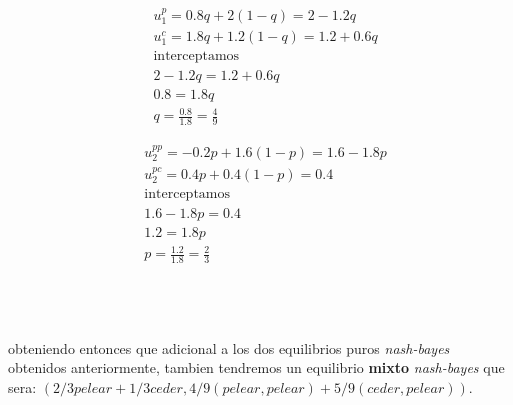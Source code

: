 \documentclass[11pt]{article}
\begin{document}
\begin{flushleft}
\begin{example}
\begin{flushleft}
            \begin{minipage}{0.35\textwidth}
                \begin{align*}
                    &u_1^p = 0.8q+2(1-q) = 2-1.2q\\
                    &u_1^c = 1.8q+1.2(1-q) = 1.2+0.6q\\
                    &\text{interceptamos}\\
                    &2-1.2q = 1.2+0.6q\\
                    &0.8=1.8q\\
                    &q=\frac{0.8}{1.8}=\frac{4}{9}
                \end{align*}
            \end{minipage}
            \hfill
            \begin{minipage}{0.35\textwidth}
                \begin{align*}
                    &u_2^{pp} = -0.2p+1.6(1-p) = 1.6-1.8p\\
                    &u_2^{pc} = 0.4p+0.4(1-p) = 0.4\\
                    &\text{interceptamos}\\
                    &1.6-1.8p = 0.4\\
                    &1.2=1.8p\\
                    &p=\frac{1.2}{1.8}=\frac{2}{3}
                \end{align*}
            \end{minipage}\\~\\~\\

            obteniendo entonces que adicional a los dos equilibrios puros \textit{nash-bayes} obtenidos anteriormente, tambien tendremos un equilibrio \textbf{mixto} \textit{nash-bayes} que sera: $(2/3pelear+1/3ceder,4/9(pelear,pelear)+5/9(ceder,pelear))$.
        \end{flushleft}
    \end{example}

\end{flushleft}


\newpage
\medskip

\nocite{*}
 

\newpage
\end{document}
